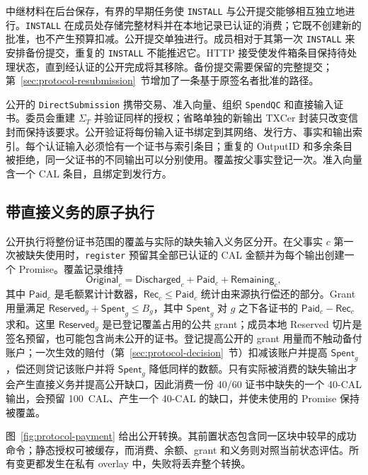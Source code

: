 中继材料在后台保存，有界的早期任务使 \texttt{INSTALL} 与公开提交能够相互独立地进行。\texttt{INSTALL} 在成员处存储完整材料并在本地记录已认证的消费；它既不创建新的批准，也不产生预算扣减。公开提交单独进行。成员相对于其第一次 \texttt{INSTALL} 来安排备份提交，重复的 \texttt{INSTALL} 不能推迟它。HTTP 接受使发件箱条目保持待处理状态，直到经认证的公开完成将其移除。备份提交需要保留的完整提交；第~\ref{sec:protocol-resubmission}~节增加了一条基于原签名者批准的路径。

公开的 \texttt{DirectSubmission} 携带交易、准入向量、组织 \texttt{SpendQC} 和直接输入证书。委员会重建 $\Sigma_T$ 并验证同样的授权；省略单独的新输出 TXCer 封装只改变信封而保持该要求。公开验证将每份输入证书绑定到其网络、发行方、事实和输出索引。每个认证输入必须恰有一个证书与索引条目；重复的 OutputID 和多余条目被拒绝，同一父证书的不同输出可以分别使用。覆盖按父事实登记一次。准入向量含一个 CAL 条目，且绑定到发行方。

\subsection{带直接义务的原子执行}
\label{sec:protocol-execution}

公开执行将整份证书范围的覆盖与实际的缺失输入义务区分开。在父事实 $c$ 第一次被缺失使用时，\texttt{register} 预留其全部已认证的 CAL 金额并为每个输出创建一个 Promise。覆盖记录维持
\begin{equation}
  \mathsf{Original}_c=
  \mathsf{Discharged}_c+\mathsf{Paid}_c+\mathsf{Remaining}_c,
  \label{eq:protocol-coverage}
\end{equation}
其中 $\mathsf{Paid}_c$ 是毛额累计计数器，$\mathsf{Rec}_c\le\mathsf{Paid}_c$ 统计由来源执行偿还的部分。Grant 用量满足 $\mathsf{Reserved}_g+\mathsf{Spent}_g\le B_g$，其中 $\mathsf{Spent}_g$ 对 $g$ 之下各证书的 $\mathsf{Paid}_c-\mathsf{Rec}_c$ 求和。这里 $\mathsf{Reserved}_g$ 是已登记覆盖占用的公共 grant；成员本地 Reserved 切片是签名预留，也可能包含尚未公开的证书。登记提高公开的 grant 用量而不触动备付账户；一次生效的赔付（第~\ref{sec:protocol-decision}~节）扣减该账户并提高 $\mathsf{Spent}_g$，偿还则贷记该账户并将 $\mathsf{Spent}_g$ 降低同样的数额。只有实际被消费的缺失输出才会产生直接义务并提高公开缺口，因此消费一份 40/60 证书中缺失的一个 40-CAL 输出，会预留 100~CAL、产生一个 40-CAL 的缺口，并使未使用的 Promise 保持被覆盖。

图~\ref{fig:protocol-payment} 给出公开转换。其前置状态包含同一区块中较早的成功命令；静态授权可被缓存，而消费、余额、grant 和义务则对照当前状态评估。所有变更都发生在私有 overlay 中，失败将丢弃整个转换。

